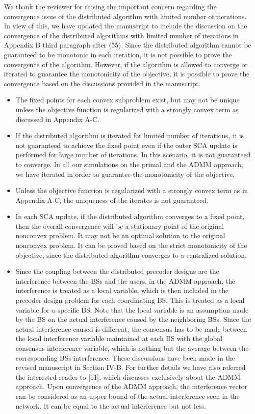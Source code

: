 \begin{enumerate}
\resp We thank the reviewer for raising the important concern regarding the convergence issue of the distributed algorithm with limited number of iterations. In view of this, we have updated the manuscript to include the discussion on the convergence of the distributed algorithms with limited number of iterations in Appendix B third paragraph after (55). Since the distributed algorithm cannot be guaranteed to be monotonic in each iteration, it is not possible to prove the convergence of the algorithm. However, if the algorithm is allowed to converge or iterated to guarantee the monotonicity of the objective, it is possible to prove the convergence based on the discussions provided in the manuscript. 
\begin{itemize}
\item The fixed points for each convex subproblem exist, but may not be unique unless the objective function is regularized with a strongly convex term as discussed in Appendix A-C.
\item If the distributed algorithm is iterated for limited number of iterations, it is not guaranteed to achieve the fixed point even if the outer \ac{SCA} update is performed for large number of iterations. In this scenario, it is not guaranteed to converge. In all our simulations on the primal and the \ac{ADMM} approach, we have iterated  in order to guarantee the monotonicity of the objective.
\item Unless the objective function is regularized with a strongly convex term as in Appendix A-C, the uniqueness of the iterates is not guaranteed. 
\item In each \ac{SCA} update, if the distributed algorithm converges to a fixed point, then the overall convergence will be a stationary point of the original nonconvex problem. It may not be an optimal solution to the original nonconvex problem. It can be proved based on the strict monotonicity of the objective, since the distributed algorithm converges to a centralized solution.
\item Since the coupling between the distributed precoder designs are the interference between the BSs and the users, in the \ac{ADMM} approach, the interference is treated as a local variable, which is then included in the precoder design problem for each coordinating BS. This is treated as a local variable for a specific BS. Note that the local variable is an assumption made by the BS on the actual interference caused by the neighboring BSs. Since the actual interference caused is different, the consensus has to be made between the local interference variable maintained at each BS with the global consensus interference variable, which is nothing but the average between the corresponding BSs interference. These discussions have been made in the revised manuscript in Section IV-B. For further details we have also referred the interested reader to [11], which discusses exclusively about the ADMM approach. Upon convergence of the \ac{ADMM} approach, the interference vector can be considered as an upper bound of the actual interference seen in the network. It can be equal to the actual interference but not less.
\end{itemize}

\end{enumerate}
